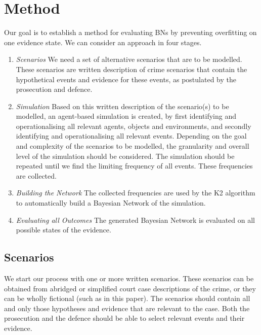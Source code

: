 \documentclass[11pt]{article}
\begin{document}
\newpage

\section{Method}



Our goal is to establish a method for evaluating BNs by preventing overfitting on one evidence state. We can consider an approach in four stages.

\begin{enumerate}
\item \emph{Scenarios} We need a set of alternative scenarios that are to be modelled. These scenarios are written description of crime scenarios that contain the hypothetical events and evidence for these events, as postulated by the prosecution and defence. 

\item  \emph{Simulation} Based on this written description of the scenario(s) to be modelled, an agent-based simulation is created, by first identifying and operationalising all relevant agents, objects and environments, and secondly identifying and operationalising all relevant events. Depending on the goal and complexity of the scenarios to be modelled, the granularity and overall level of the simulation should be considered. The simulation should be repeated until we find the limiting frequency of all events. These frequencies are collected.

\item  \emph{Building the Network} The collected frequencies are used by the K2 algorithm to automatically build a Bayesian Network of the simulation. 

\item  \emph{Evaluating all Outcomes} The generated Bayesian Network is evaluated on all possible states of the evidence.

\end{enumerate}

\subsection{Scenarios}
We start our process with one or more written scenarios. These scenarios can be obtained from abridged or simplified court case descriptions of the crime, or they can be wholly fictional (such as in this paper). The scenarios should contain all and only those hypotheses and evidence that are relevant to the case. Both the prosecution and the defence should be able to select relevant events and their evidence. 
\end{document}
